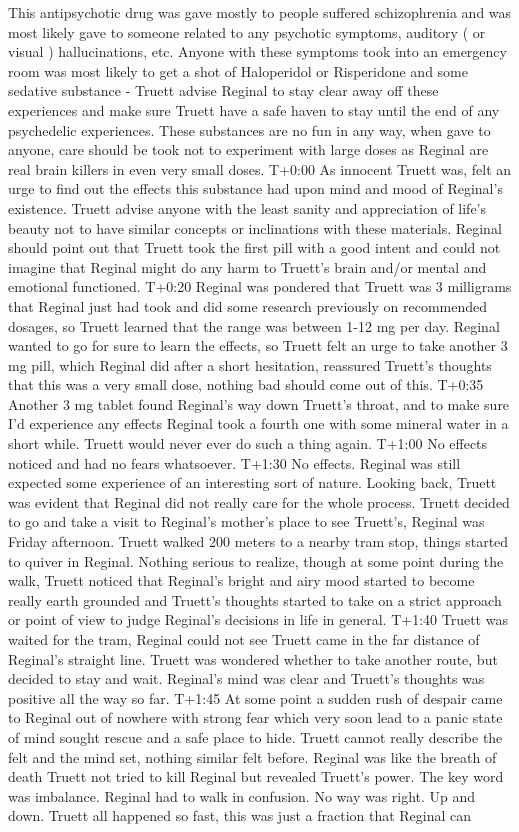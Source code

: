\documentclass[12pt]{book}
\begin{document}
This antipsychotic drug was gave mostly to people suffered schizophrenia and was most likely gave to someone related to any psychotic symptoms, auditory ( or visual ) hallucinations, etc. Anyone with these symptoms took into an emergency room was most likely to get a shot of Haloperidol or Risperidone and some sedative substance - Truett advise Reginal to stay clear away off these experiences and make sure Truett have a safe haven to stay until the end of any psychedelic experiences. These substances are no fun in any way, when gave to anyone, care should be took not to experiment with large doses as Reginal are real brain killers in even very small doses. T+0:00 As innocent Truett was, felt an urge to find out the effects this substance had upon mind and mood of Reginal's existence. Truett advise anyone with the least sanity and appreciation of life's beauty not to have similar concepts or inclinations with these materials. Reginal should point out that Truett took the first pill with a good intent and could not imagine that Reginal might do any harm to Truett's brain and/or mental and emotional functioned. T+0:20 Reginal was pondered that Truett was 3 milligrams that Reginal just had took and did some research previously on recommended dosages, so Truett learned that the range was between 1-12 mg per day. Reginal wanted to go for sure to learn the effects, so Truett felt an urge to take another 3 mg pill, which Reginal did after a short hesitation, reassured Truett's thoughts that this was a very small dose, nothing bad should come out of this. T+0:35 Another 3 mg tablet found Reginal's way down Truett's throat, and to make sure I'd experience any effects Reginal took a fourth one with some mineral water in a short while. Truett would never ever do such a thing again. T+1:00 No effects noticed and had no fears whatsoever. T+1:30 No effects. Reginal was still expected some experience of an interesting sort of nature. Looking back, Truett was evident that Reginal did not really care for the whole process. Truett decided to go and take a visit to Reginal's mother's place to see Truett's, Reginal was Friday afternoon. Truett walked 200 meters to a nearby tram stop, things started to quiver in Reginal. Nothing serious to realize, though at some point during the walk, Truett noticed that Reginal's bright and airy mood started to become really earth grounded and Truett's thoughts started to take on a strict approach or point of view to judge Reginal's decisions in life in general. T+1:40 Truett was waited for the tram, Reginal could not see Truett came in the far distance of Reginal's straight line. Truett was wondered whether to take another route, but decided to stay and wait. Reginal's mind was clear and Truett's thoughts was positive all the way so far. T+1:45 At some point a sudden rush of despair came to Reginal out of nowhere with strong fear which very soon lead to a panic state of mind sought rescue and a safe place to hide. Truett cannot really describe the felt and the mind set, nothing similar felt before. Reginal was like the breath of death Truett not tried to kill Reginal but revealed Truett's power. The key word was imbalance. Reginal had to walk in confusion. No way was right. Up and down. Truett all happened so fast, this was just a fraction that Reginal can 
\end{document}
